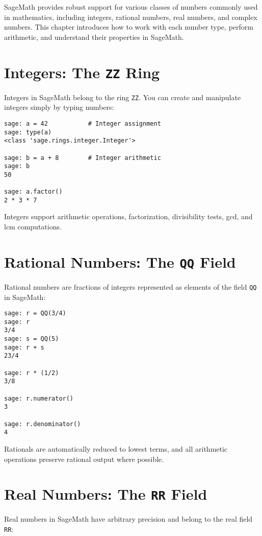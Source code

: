 \documentclass[12pt]{book}
\begin{document}
SageMath provides robust support for various classes of numbers commonly used in mathematics, including integers, rational numbers, real numbers, and complex numbers. This chapter introduces how to work with each number type, perform arithmetic, and understand their properties in SageMath.

\section{Integers: The \texttt{ZZ} Ring}

Integers in SageMath belong to the ring \texttt{ZZ}. You can create and manipulate integers simply by typing numbers:

\begin{verbatim}
sage: a = 42           # Integer assignment
sage: type(a)
<class 'sage.rings.integer.Integer'>

sage: b = a + 8        # Integer arithmetic
sage: b
50

sage: a.factor()
2 * 3 * 7
\end{verbatim}

Integers support arithmetic operations, factorization, divisibility tests, gcd, and lcm computations.

\section{Rational Numbers: The \texttt{QQ} Field}

Rational numbers are fractions of integers represented as elements of the field \texttt{QQ} in SageMath:

\begin{verbatim}
sage: r = QQ(3/4)
sage: r
3/4
sage: s = QQ(5)
sage: r + s
23/4

sage: r * (1/2)
3/8

sage: r.numerator()
3

sage: r.denominator()
4
\end{verbatim}

Rationals are automatically reduced to lowest terms, and all arithmetic operations preserve rational output where possible.

\section{Real Numbers: The \texttt{RR} Field}

Real numbers in SageMath have arbitrary precision and belong to the real field \texttt{RR}:
\end{document}
